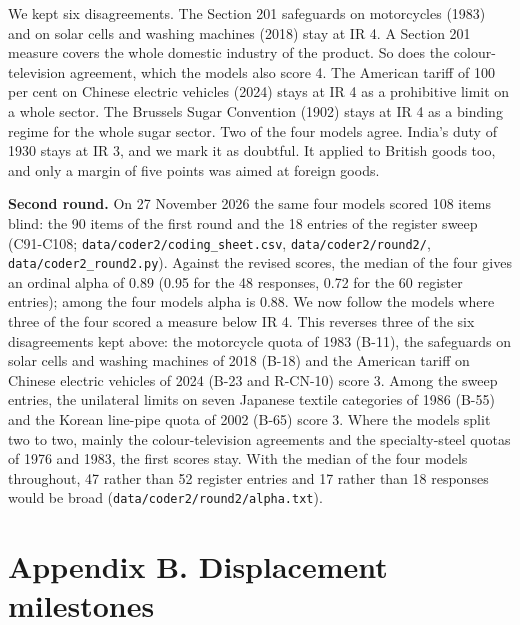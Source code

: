 We kept six disagreements. The Section 201 safeguards on motorcycles
(1983) and on solar cells and washing machines (2018) stay at IR 4. A
Section 201 measure covers the whole domestic industry of the product.
So does the colour-television agreement, which the models also score 4.
The American tariff of 100 per cent on Chinese electric vehicles (2024)
stays at IR 4 as a prohibitive limit on a whole sector. The Brussels
Sugar Convention (1902) stays at IR 4 as a binding regime for the whole
sugar sector. Two of the four models agree. India's duty of 1930 stays
at IR 3, and we mark it as doubtful. It applied to British goods too,
and only a margin of five points was aimed at foreign goods.

\textbf{Second round.} On 27 November 2026 the same four models scored
108 items blind: the 90 items of the first round and the 18 entries of
the register sweep (C91-C108; \texttt{data/\allowbreak{}coder2/\allowbreak{}coding\_\allowbreak{}sheet.csv},
\texttt{data/\allowbreak{}coder2/\allowbreak{}round2/\allowbreak{}}, \texttt{data/\allowbreak{}coder2\_\allowbreak{}round2.py}). Against
the revised scores, the median of the four gives an ordinal alpha of
0.89 (0.95 for the 48 responses, 0.72 for the 60 register entries);
among the four models alpha is 0.88. We now follow the models where
three of the four scored a measure below IR 4. This reverses three of
the six disagreements kept above: the motorcycle quota of 1983 (B-11),
the safeguards on solar cells and washing machines of 2018 (B-18) and
the American tariff on Chinese electric vehicles of 2024 (B-23 and
R-CN-10) score 3. Among the sweep entries, the unilateral limits on
seven Japanese textile categories of 1986 (B-55) and the Korean
line-pipe quota of 2002 (B-65) score 3. Where the models split two to
two, mainly the colour-television agreements and the specialty-steel
quotas of 1976 and 1983, the first scores stay. With the median of the
four models throughout, 47 rather than 52 register entries and 17 rather
than 18 responses would be broad
(\texttt{data/\allowbreak{}coder2/\allowbreak{}round2/\allowbreak{}alpha.txt}).

\hypertarget{b.-displacement-milestones}{%
\section*{Appendix B. Displacement milestones}\label{b.-displacement-milestones}}

